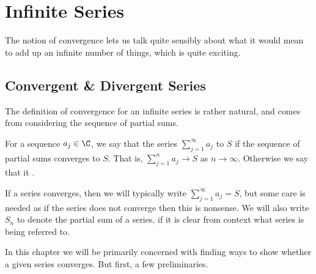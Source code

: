 
	

\clearpage
\section{Infinite Series}\label{sec:2}

The notion of convergence lets us talk quite sensibly about what it would mean to add up an infinite number of things, which is quite exciting. 

\subsection{Convergent \& Divergent Series}

The definition of convergence for an infinite series is rather natural, and comes from considering the sequence of partial sums.


\begin{definition}
		For a sequence $a_j \in \C$, we say that the series $\sum_{j = 1}^{\infty} a_j$  to $S$ if the sequence of partial sums converges to $S$.
		That is, $\sum_{j = 1}^{n} a_j \rightarrow S$ as $n \rightarrow \infty$. Otherwise we say that it .
	\end{definition}

	\begin{remark}[Notation]
		If a series converges, then we will typically write $\sum_{j = 1}^{\infty} a_j = S$, but some care is needed as if the series does not converge then this is nonsense. 
		We will also write $S_n$ to denote the partial sum of a series, if it is clear from context what series is being referred to.
	\end{remark}

In this chapter we will be primarily concerned with finding ways to show whether a given series converges. But first, a few preliminaries.

